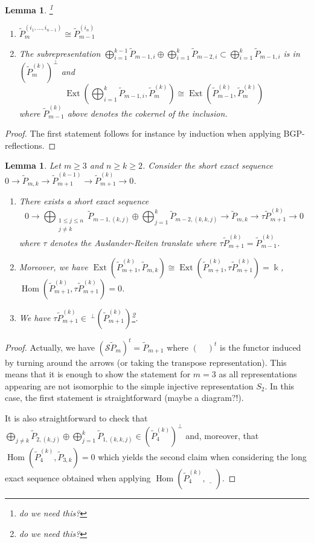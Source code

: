 \documentclass{amsart}
\newtheorem{lemma}[theorem]{Lemma}
\newcommand{\kk}{\Bbbk}
\newcommand{\Ext}{\operatorname{Ext}}
\newcommand{\Hom}{\operatorname{Hom}}
\newcommand{\ses}[3]{0\rightarrow #1\rightarrow #2\rightarrow#3\rightarrow 0}
\begin{document}
\begin{lemma}\footnote{do we need this?}
  \begin{enumerate}
    \item $\tilde P_m^{(i_1,\ldots,i_{n-1})}\cong\tilde P_{m-1}^{(i_n)}$
    \item The subrepresentation $\bigoplus_{i=1}^{k-1}\tilde P_{m-1,i}\oplus\bigoplus_{i=1}^k\tilde P_{m-2,i}\subset\bigoplus_{i=1}^k\tilde P_{m-1,i}$ is in $(\tilde P_m^{(k)})^\perp$ and
      \[\Ext(\bigoplus_{i=1}^k\tilde P_{m-1,i},\tilde P_m^{(k)})\cong\Ext(\tilde P_{m-1}^{(k)},\tilde P_m^{(k)})\]
      where $\tilde P_{m-1}^{(k)}$ above denotes the cokernel of the inclusion.
  \end{enumerate}
\end{lemma}
\begin{proof}
The first statement follows for instance by induction when applying BGP-reflections.
\end{proof}
\begin{lemma}\label{AR}
Let $m\geq 3$ and $n\geq k\geq 2$. Consider the short exact sequence $\ses{\tilde P_{m,k}}{\tilde P_{m+1}^{(k-1)}}{\tilde P_{m+1}^{(k)}}$. 
\begin{enumerate}
\item There exists a short exact sequence 
\[\ses{\bigoplus_{\substack{1\leq j\leq n\\j\neq k}}\tilde P_{m-1,(k,j)}\oplus \bigoplus_{j=1}^k\tilde P_{m-2,(k,k,j)}}{\tilde P_{m,k}}{\tau\tilde P_{m+1}^{(k)}}\]
where $\tau$ denotes the Auslander-Reiten translate where
$\tau\tilde P_{m+1}^{(k)}=\tilde P_{m-1}^{(k)}$. 
\item Moreover, we have $\Ext(\tilde P_{m+1}^{(k)},\tilde P_{m,k})\cong \Ext(\tilde P_{m+1}^{(k)},\tau\tilde P_{m+1}^{(k)})=\kk$, $\Hom(\tilde P_{m+1}^{(k)},\tau\tilde P_{m+1}^{(k)})=0$. 
\item We have $\tau\tilde P_{m+1}^{(k)}\in ~^\perp(\tilde P_{m+1}^{(k)})$\footnote{do we need this?}. 
\end{enumerate}%
\end{lemma}
\begin{proof}
Actually, we have $(\mathcal  S \tilde P_m)^t=\tilde P_{m+1}$ where $(\quad)^t$ is the functor induced by turning around the arrows (or taking the transpose representation). This means that it is enough to show the statement for $m=3$ as all representations appearing are not isomorphic to the simple injective representation $S_2$. In this case, the first statement is straightforward (maybe a diagram?!).

It is also straightforward to check that $\bigoplus_{j\neq k}\tilde P_{2,(k,j)}\oplus \bigoplus_{j=1}^k\tilde P_{1,(k,k,j)}\in (\tilde P_{4}^{(k)})^\perp$ and, moreover, that $\Hom(\tilde P_{4}^{(k)},\tilde P_{3,k})=0$ which yields the second claim when considering the long exact sequence obtained when applying $\Hom(\tilde P_{4}^{(k)},\underline{\quad})$.


\end{proof}
\end{document}
